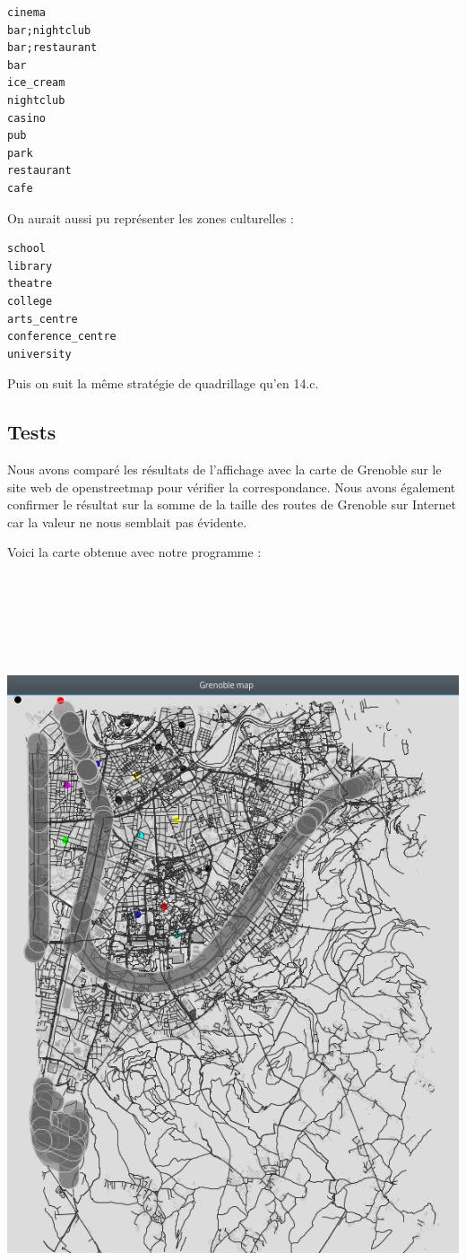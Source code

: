 \documentclass[12pt,a4paper]{article}
\begin{document}
\begin{lstlisting}
cinema
bar;nightclub
bar;restaurant
bar
ice_cream
nightclub
casino
pub
park
restaurant
cafe
\end{lstlisting}

On aurait aussi pu représenter les zones culturelles :

\begin{lstlisting}
school
library
theatre
college
arts_centre
conference_centre
university
\end{lstlisting}

Puis on suit la même stratégie de quadrillage qu'en 14.c.

\subsection*{Tests}

Nous avons comparé les résultats de l'affichage avec la carte de Grenoble sur le site web de openstreetmap pour vérifier la correspondance. Nous avons également confirmer le résultat sur la somme de la taille des routes de Grenoble sur Internet car la valeur ne nous semblait pas évidente.

\newpage
Voici la carte obtenue avec notre programme :

\includegraphics[height=23cm]{map.png}
\end{document}
